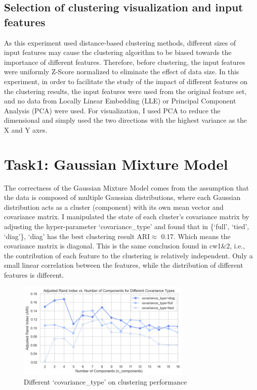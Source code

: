 \documentclass[journal]{IEEEtai}
\begin{document}
\subsection{\textbf{Selection of clustering visualization and input features}}
As this experiment used distance-based clustering methods, different sizes of input features may cause the clustering algorithm to be biased towards the importance of different features. Therefore, before clustering, the input features were uniformly Z-Score normalized to eliminate the effect of data size. In this experiment, in order to facilitate the study of the impact of different features on the clustering results, the input features were used from the original feature set, and no data from Locally Linear Embedding (LLE) or Principal Component Analysis (PCA) were used. For visualization, I used PCA to reduce the dimensional and simply used the two directions with the highest variance as the X and Y axes.

\section{\textbf{Task1: Gaussian Mixture Model}}
The correctness of the Gaussian Mixture Model comes from the assumption that the data is composed of multiple Gaussian distributions, where each Gaussian distribution acts as a cluster (component) with its own mean vector and covariance matrix. I manipulated the state of each cluster's covariance matrix by adjusting the hyper-parameter `covariance\_type' and found that in \{`full', `tied', `diag'\}, `diag' has the best clustering result ARI$\approx$ 0.17. Which means the covariance matrix is diagonal. This is the same conclusion found in cw1\&2, i.e., the contribution of each feature to the clustering is relatively independent. Only a small linear correlation between the features, while the distribution of different features is different.

\begin{figure}[htbp]
	\centerline{\includegraphics[width=20pc]{ARI_vs_Conv_type.png}}
	\caption{Different `covariance\_type' on clustering performance}
\end{figure}
\end{document}
